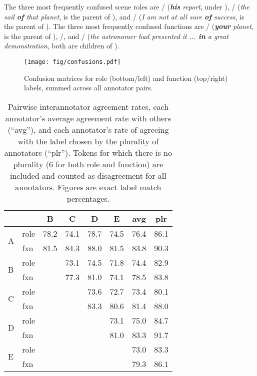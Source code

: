 \pdfoutput=1 \documentclass[11pt,a4paper]{article}
\begin{document}
The three most frequently confused scene roles are / (\textit{\textbf{his} report}, under ), / (\textit{the soil \textbf{of} that planet},  is the parent of ), and / (\textit{I am not at all sure \textbf{of} success},  is the parent of ).
The three most frequently confused functions are / (\textit{\textbf{your} planet},  is the parent of ), /, and / (\textit{the astronomer had presented it ... \textbf{in} a great demonstration}, both are children of ).

\begin{figure*}[]\small\centering
\texttt{[image: fig/confusions.pdf]}
\caption{Confusion matrices for role (bottom/left) and function (top/right) labels, summed across all annotator pairs.}
\label{fig:confusion}
\end{figure*}

\begin{table}\centering\small
\begin{tabular}{llcccccc}
  &      & B    & C    & D    & E    & avg  & plr \\
\toprule
\multirow{2}{*}{A} & role & 78.2 & 74.1 & 78.7 & 74.5 & 76.4 & 86.1 \\
                   & fxn  & 81.5 & 84.3 & 88.0 & 81.5 & 83.8 & 90.3 \\\midrule
\multirow{2}{*}{B} & role & 	 & 73.1 & 74.5 & 71.8 & 74.4 & 82.9 \\
                   & fxn  &      & 77.3 & 81.0 & 74.1 & 78.5 & 83.8 \\\midrule
\multirow{2}{*}{C} & role &      &      & 73.6 & 72.7 & 73.4 & 80.1 \\
                   & fxn  &      &      & 83.3 & 80.6 & 81.4 & 88.0 \\\midrule
\multirow{2}{*}{D} & role &      &      &      & 73.1 & 75.0 & 84.7 \\
                   & fxn  &      &      &      & 81.0 & 83.3 & 91.7 \\\midrule
\multirow{2}{*}{E} & role &      &      &      &      & 73.0 & 83.3 \\
                   & fxn  &      &      &      &      & 79.3 & 86.1 \\
\end{tabular}
\caption{Pairwise interannotator agreement rates, each annotator's average agreement rate with others (``avg''), and each annotator's rate of agreeing with the label chosen by the plurality of annotators (``plr''). Tokens for which there is no plurality (6 for both role and function) are included and counted as disagreement for all annotators.
Figures are exact label match percentages.}
\label{tab:pairwise-iaa}
\end{table}
\end{document}
